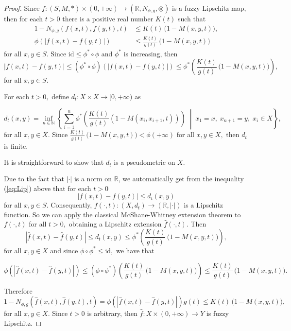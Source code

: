 \documentclass[12pt]{amsart}
\begin{document}
	\begin{proof}
		Since $f:(S,M,\ast) \times (0,+\infty) \to  (\mathbb R, N_{\phi,g}, \circledast)
		$ is a fuzzy Lipschitz map, then for each $t>0$
		there is a positive real number $K(t)$ such that
		\begin{align*}
			1- N_{\phi,g}(f(x,t),f(y,t),t) & \le K(t) \, \Big( 1- M(x,y,t) \Big),\\
			\phi(|f(x,t)-f(y,t)|) &\le \frac{K(t)}{g(t)} \, \Big( 1- M(x,y,t) \Big)
		\end{align*}
		for all $x,y\in S.$  Since  $\mathrm{id}\leq \phi^*\circ \phi$ and $\phi^*$ is increasing, then
		\begin{equation}
			|f(x,t)-f(y,t)| \le (\phi^*\circ\phi)(|f(x,t)-f(y,t)| )\le \phi^{*} \left( \frac{K(t)}{g(t)} \, \big( 1- M(x,y,t) \big) \right)\!,	\label{eq:Lip}
		\end{equation}
		for all $x, y \in S.$ 
		
		For each $t>0,$ define $d_t:X\times X\to [0,+\infty)$ as
		
		$$
		d_t(x,y)=\inf_{n\in\mathbb{N}} \left\{ \sum_{i=1}^n \phi^{*}\left( \frac{K(t)}{g(t)} (1 - M(x_i,x_{i+1},t)) \right) \;\middle|\; x_1{=}x,\; x_{n+1}{=}y,\; x_i \in X \right\}\!,
		$$
		for all $x,y\in X$. Since $\frac{K(t)}{g(t)} \, \big( 1- M(x,y,t) \big)< \phi(+\infty)$
		for all $x,y\in X,$ then $d_t$ is finite. 
		
		It is straightforward to show that $d_t$ is a pseudometric on $X.$
		
		Due to the fact that $|\cdot|$ is a norm on $\mathbb{R}$, we automatically get from the inequality (\ref{eq:Lip}) above that for each $t>0$
		$$|f(x, t)-f(y, t)|\leq d_t(x,y)$$
		for all $x,y\in S.$ Consequently, $f(\cdot,t):(X,d_t)\to (\mathbb{R},|\cdot|)$ is a Lipschitz function. So we can apply the classical McShane-Whitney extension theorem to $f(\cdot,t)$ for all $t>0,$ obtaining a Lipschitz extension $\hat f(\cdot, t)$. Then 
		\[
		|\hat f(x,t)- \hat f(y,t)| \le d_{t}(x,y)\leq \phi^{*} \left(\frac{K(t)}{g(t)} \, \big( 1- M(x,y,t) \big) \right)\!,
		\]
		for all $x,y\in X$ and since $\phi \circ \phi^* \leq \mathrm{id},$ we have that
		
		\[
		\phi(|\hat f(x,t)- \hat f(y,t)|) \le (\phi\circ \phi^{*}) \left(\frac{K(t)}{g(t)} \, \big( 1- M(x,y,t) \big) \right)\le \frac{K(t)}{g(t)} \, \big( 1- M(x,y,t)\big).
		\]
		
		Therefore
		\[
		1- N_{\phi,g} (\hat f(x,t), \hat f(y,t),t) = \phi(|\hat f(x,t)-\hat f(y,t)|) g(t) \le K(t) \, \big( 1- M(x,y,t) \big),
		\]
		for all $x,y\in X.$ Since $t>0$ is arbitrary, then $\hat f:X\times (0,+\infty)\to Y$ is fuzzy Lipschitz.
	\end{proof}
	
\end{document}
